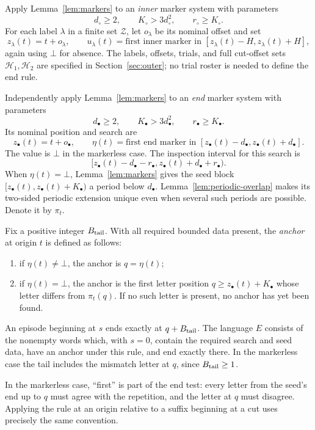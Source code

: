 Apply Lemma~\ref{lem:markers} to an \emph{inner} marker system with
parameters
\[
 d_\circ\ge2,\qquad K_\circ>3d_\circ^2,
 \qquad r_\circ\ge K_\circ.
\]
For each label $\lambda$ in a finite set $\mathcal Z$, let $o_\lambda$
be its nominal offset and set
\[
 z_\lambda(t)=t+o_\lambda,\qquad
 u_\lambda(t)=\text{first inner marker in }
 [z_\lambda(t)-H,z_\lambda(t)+H],
\]
again using $\bot$ for absence.  The labels, offsets, trials, and full
cut-offset sets $\mathcal H_1,\mathcal H_2$ are specified in
Section~\ref{sec:outer}; no trial roster is needed to define the end rule.

Independently apply Lemma~\ref{lem:markers} to an \emph{end} marker system
with parameters
\[
 d_\bullet\ge2,\qquad K_\bullet>3d_\bullet^2,
 \qquad r_\bullet\ge K_\bullet.
\]
Its nominal position and search are
\[
 z_\bullet(t)=t+o_\bullet,\qquad
 \eta(t)=\text{first end marker in }
 [z_\bullet(t)-d_\bullet,z_\bullet(t)+d_\bullet].
\]
The value is $\bot$ in the markerless case.  The inspection interval for
this search is
\[
 [z_\bullet(t)-d_\bullet-r_\bullet,
   z_\bullet(t)+d_\bullet+r_\bullet).
\]
When $\eta(t)=\bot$, Lemma~\ref{lem:markers} gives the seed block
$[z_\bullet(t),z_\bullet(t)+K_\bullet)$ a period below $d_\bullet$.
Lemma~\ref{lem:periodic-overlap} makes its two-sided periodic extension
unique even when several such periods are possible.  Denote it by
$\pi_t$.

\begin{definition}\label{def:episodes}
Fix a positive integer $B_{\rm tail}$.  With all required bounded data
present, the \emph{anchor} at origin $t$ is defined as follows:
\begin{enumerate}[label=\textnormal{(\roman*)}]
\item if $\eta(t)\ne\bot$, the anchor is $q=\eta(t)$;
\item if $\eta(t)=\bot$, the anchor is the first letter position
$q\ge z_\bullet(t)+K_\bullet$ whose letter differs from $\pi_t(q)$.
If no such letter is present, no anchor has yet been found.
\end{enumerate}
An episode beginning at $s$ ends exactly at $q+B_{\rm tail}$.
The language $E$ consists of the nonempty words which, with $s=0$, contain
the required search and seed data, have an anchor under this rule, and
end exactly there.  In the markerless case the tail includes the mismatch
letter at $q$, since $B_{\rm tail}\ge1$.
\end{definition}

In the markerless case, ``first'' is part of the end test: every letter
from the seed's end up to $q$ must agree with the repetition, and the
letter at $q$ must disagree.  Applying the rule at an origin relative to a
suffix beginning at a cut uses precisely the same convention.

